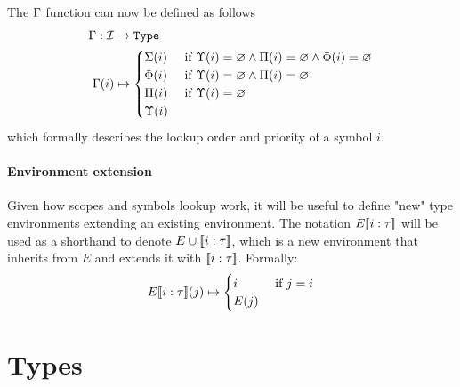 
The $\Gamma$ function can now be defined as follows
\[
	\begin{split}
		\Gamma : \mathcal{I} & \to \texttt{Type}\\*
		\Gamma(i) & \mapsto \begin{cases}
			\Sigma(i) &\text{ if } \Upsilon(i)=\varnothing \land \Pi(i)=\varnothing \land \Phi(i)=\varnothing \\*
			\Phi(i) &\text{ if } \Upsilon(i)=\varnothing \land \Pi(i)=\varnothing \\*
			\Pi(i) &\text{ if } \Upsilon(i)=\varnothing \\*
			\Upsilon(i) & \\*
		\end{cases}
	\end{split}
\]
which formally describes the lookup order and priority of a symbol $i$.

\paragraph{Environment extension} Given how scopes and symbols lookup work, it
will be useful to define "new" type environments extending an existing
environment. The notation $E[\![i:\tau]\!]$ will be used as a shorthand to denote
$E \cup [\![i:\tau]\!]$, which is a new environment that inherits from $E$ and
extends it with $[\![i:\tau]\!]$. Formally:
\[
	E[\![i:\tau]\!](j) \mapsto \begin{cases}
		i &\text{ if } j = i \\*
		E(j) & \\*
	\end{cases}
\]

\clearpage

\section{Types}




